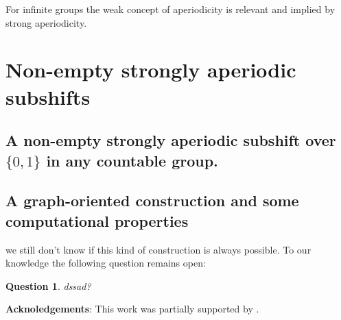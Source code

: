 \documentclass[letterpaper]{amsart}
\theoremstyle{plain}
\newtheorem*{question*}{Question}
\begin{document}
	For infinite groups the weak concept of aperiodicity is relevant and implied by strong aperiodicity.
	
	
	\section{Non-empty strongly aperiodic subshifts}
	\label{section.strongly_aperiodic_subshifts}
	

	
	\subsection{A non-empty strongly aperiodic subshift over $\{0,1\}$ in any countable group.}
	\label{subsection.simpler_proof}
	

	\subsection{A graph-oriented construction and some computational properties}
	\label{subsection.strongly_aperiodic_subshifts_LLL}
	

we still don't know if this kind of construction is always possible. To our knowledge the following question remains open:
	\begin{question*}
	dssad?
	\end{question*}
	
	
	\textbf{Acknoledgements}: This work was partially supported by .
	
\end{document}
